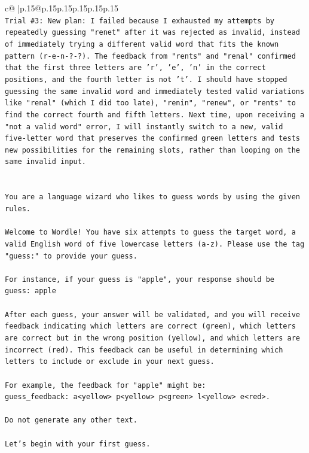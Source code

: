 \documentclass{article}
\begin{document}
{\begin{supertabular}{c@{$\;$}|p{.15\linewidth}@{}p{.15\linewidth}p{.15\linewidth}p{.15\linewidth}p{.15\linewidth}p{.15\linewidth}}
{{{\\ 
\texttt{Trial \#3: New plan: I failed because I exhausted my attempts by repeatedly guessing "renet" after it was rejected as invalid, instead of immediately trying a different valid word that fits the known pattern (r{-}e{-}n{-}?{-}?). The feedback from "rents" and "renal" confirmed that the first three letters are 'r', 'e', 'n' in the correct positions, and the fourth letter is not 't'. I should have stopped guessing the same invalid word and immediately tested valid variations like "renal" (which I did too late), "renin", "renew", or "rents" to find the correct fourth and fifth letters. Next time, upon receiving a "not a valid word" error, I will instantly switch to a new, valid five{-}letter word that preserves the confirmed green letters and tests new possibilities for the remaining slots, rather than looping on the same invalid input.} \\
\\ 
\\ 
\texttt{You are a language wizard who likes to guess words by using the given rules.} \\
\\ 
\texttt{Welcome to Wordle! You have six attempts to guess the target word, a valid English word of five lowercase letters (a{-}z). Please use the tag "guess:" to provide your guess.} \\
\\ 
\texttt{For instance, if your guess is "apple", your response should be} \\
\texttt{guess: apple} \\
\\ 
\texttt{After each guess, your answer will be validated, and you will receive feedback indicating which letters are correct (green), which letters are correct but in the wrong position (yellow), and which letters are incorrect (red). This feedback can be useful in determining which letters to include or exclude in your next guess.} \\
\\ 
\texttt{For example, the feedback for "apple" might be:} \\
\texttt{guess\_feedback: a<yellow> p<yellow> p<green> l<yellow> e<red>.} \\
\\ 
\texttt{Do not generate any other text.} \\
\\ 
\texttt{Let's begin with your first guess.} \\
            }
        }
    }
     \\ \\


\end{supertabular}}
\end{document}
